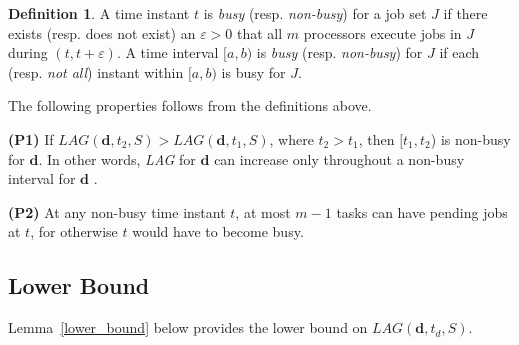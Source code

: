 \documentclass[Times, 10pt,twocolumn]{article}
\theoremstyle{definition}
\newtheorem{definition}{\textbf{Definition}}
\begin{document}
\begin{definition}
A time instant $t$ is \textit{busy} (resp. \textit{non-busy}) for a job set $J$ if there exists (resp. does not exist) an $\varepsilon > 0 $ that all $m$ processors execute jobs in $J$ during $(t,t+ \varepsilon) $. A time interval $[a,b)$ is \textit{busy} (resp. \textit{non-busy}) for $J$ if each (resp. \textit{not all}) instant within $[a,b)$ is busy for $J$. \end{definition}

The following properties follows from the definitions above.

\begin{changemargin}{4mm}{4mm}
\textbf{(P1)} If $LAG(\textbf{d}, t_2, S) > LAG(\textbf{d}, t_1, S)$, where $t_2 > t_1$, then $[t_1, t_2$) is non-busy for $\textbf{d}$. In other words, \textit{LAG} for $\textbf{d}$ can increase only throughout a non-busy interval for $\textbf{d}$ . 
\end{changemargin}



\begin{changemargin}{4mm}{4mm}
\textbf{(P2)} At any non-busy time instant $t$, at most $m-1$ tasks can have pending jobs at $t$, for otherwise $t$ would have to become busy. 
\end{changemargin}







\subsection{Lower Bound}
\label{sec:lower_bound}

Lemma~\ref{lower_bound} below provides the lower bound on $LAG(\textbf{d}, t_d, {S})$.
\end{document}
